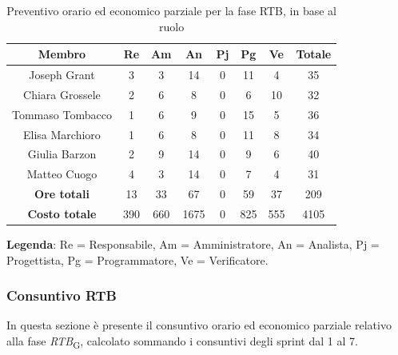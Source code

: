 \documentclass[11pt,a4paper]{article}
\begin{document}
\begin{table}[H]
    \centering
    \begin{tabular}{|c|c|c|c|c|c|c|c|}
        \hline
        \textbf{Membro} & \textbf{Re} & \textbf{Am} & \textbf{An} & \textbf{Pj} & \textbf{Pg} & \textbf{Ve} & \textbf{Totale} \\
        \hline
        Joseph Grant & 3 & 3 & 14 & 0 & 11 & 4 & 35 \\
        Chiara Grossele & 2 & 6 & 8 & 0 & 6 & 10 & 32 \\
        Tommaso Tombacco & 1 & 6 & 9 & 0 & 15 & 5 & 36 \\
        Elisa Marchioro & 1 & 6 & 8 & 0 & 11 & 8 & 34 \\
        Giulia Barzon & 2 & 9 & 14 & 0 & 9 & 6 & 40 \\
        Matteo Cuogo & 4 & 3 & 14 & 0 & 7 & 4 & 31 \\
        \hline
        \textbf{Ore totali} & 13 & 33 & 67 & 0 & 59 & 37 & 209 \\
        \hline
        \textbf{Costo totale} & 390 & 660 & 1675 & 0 & 825 & 555 & 4105 \\
        \hline
    \end{tabular}
    \caption{Preventivo orario ed economico parziale per la fase RTB, in base al ruolo}
\end{table}

\textbf{Legenda}: Re = Responsabile, Am = Amministratore, An = Analista, Pj = Progettista, Pg = Programmatore, Ve = Verificatore.

\subsubsection{Consuntivo RTB}
In questa sezione è presente il consuntivo orario ed economico parziale relativo alla fase \textit{RTB}\textsubscript{G}, calcolato sommando i consuntivi degli sprint dal 1 al 7.
\end{document}
